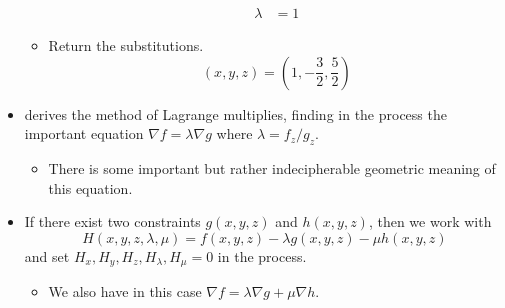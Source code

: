 \documentclass[../main.tex]{subfiles}
\begin{document}
\begin{itemize}
\begin{itemize}
\begin{align*}
            \lambda &= 1
        \end{align*}
        \item Return the substitutions.
        \begin{equation*}
            (x,y,z) = \left( 1,-\frac{3}{2},\frac{5}{2} \right)
        \end{equation*}
    \end{itemize}
    \item \cite{bib:Thomas} derives the method of Lagrange multiplies, finding in the process the important equation $\nabla f=\lambda\nabla g$ where $\lambda=f_z/g_z$.
    \begin{itemize}
        \item There is some important but rather indecipherable geometric meaning of this equation.
    \end{itemize}
    \item If there exist two constraints $g(x,y,z)$ and $h(x,y,z)$, then we work with
    \begin{equation*}
        H(x,y,z,\lambda,\mu) = f(x,y,z)-\lambda g(x,y,z)-\mu h(x,y,z)
    \end{equation*}
    and set $H_x,H_y,H_z,H_\lambda,H_\mu=0$ in the process.
    \begin{itemize}
        \item We also have in this case $\nabla f=\lambda\nabla g+\mu\nabla h$.
    \end{itemize}
\end{itemize}
\end{document}
